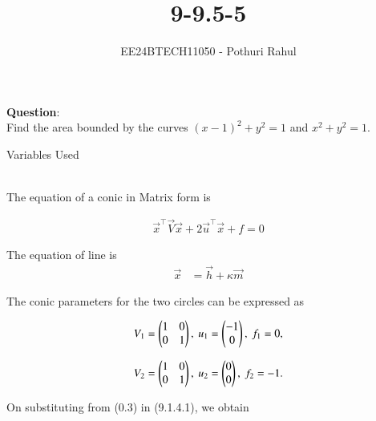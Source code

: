 \documentclass[journal]{IEEEtran}
\begin{document}

\vspace{3cm}

\title{9-9.5-5}
\author{EE24BTECH11050 - Pothuri Rahul}
{\let\newpage\relax\maketitle}

\renewcommand{\thefigure}{\theenumi}
\renewcommand{\thetable}{\theenumi}
\setlength{\intextsep}{10pt} %


\renewcommand{\thetable}{\theenumi}
\textbf{Question}:\\
Find the area bounded by the curves $(x-1)^2 + y^2 = 1$ and $x^2 + y^2 = 1$.  \\
\solution 
\begin{table}[h!]
    \centering
    
    \caption{Variables Used}
    \label{tab:9.5-5}
\end{table}
\\

The equation of a conic in Matrix form is

\begin{align}
\vec{x}^\top\vec{V}\vec{x} + 2\vec{u}^\top\vec{x} + f = 0
\end{align}

The equation of line is
\begin{align}
\vec{x}&=\vec{h}+\kappa\vec{m}
\end{align}

The conic parameters for the two circles can be expressed as

 \begin{align}
V_1 = \begin{pmatrix}1 & 0 \\ 0 & 1\end{pmatrix}, \ u_1 = \begin{pmatrix} -1 \\ 0\end{pmatrix}, \ f_1 = 0, 
 \end{align}

 \begin{align}
V_2 = \begin{pmatrix}1 & 0 \\ 0 & 1\end{pmatrix}, \ u_2 = \begin{pmatrix}0 \\ 0\end{pmatrix}, \ f_2 = -1.
 \end{align}

On substituting from (0.3) in (9.1.4.1), we obtain
\end{document}
